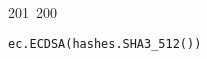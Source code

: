 201~200~\documentclass{article}
\begin{document}
\begin{lstlisting}[language=Python, caption=Signing and Verifying Messages]
	                                                                                                                                                                                                                                                                                                	                                                                                                                                        	    	                                                                                                	                                                                                                                                                                                                                                                                                                                                	                                                                        	                                                                        	                                                                                                                                        	                                                                                                                                                                                                                        	                                                                                                                            	                                                                	                                    ec.ECDSA(hashes.SHA3_512())
	                                                                                                                                                                                                                                                                                                	                                                                                                                                        	    	                                                                                                	                                                                                                                                                                                                                                                                                                                                	                                                                        	                                                                        	                                                                                                                                        	                                                                                                                                                                                                                        	                                                                                                                            	                                                                	                                            )

\end{lstlisting}
\end{document}
